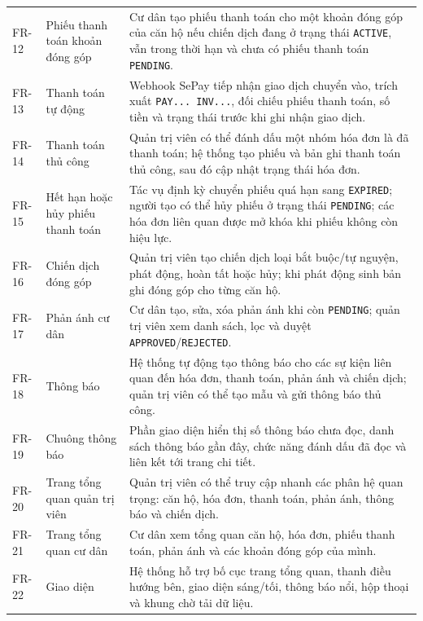 ﻿\documentclass[12pt,a4paper]{report}
\begin{document}
\begin{longtable}{L{1.4cm} L{3cm} L{9cm}}
FR-12 & Phiếu thanh toán khoản đóng góp & Cư dân tạo phiếu thanh toán cho một khoản đóng góp của căn hộ nếu chiến dịch đang ở trạng thái \texttt{ACTIVE}, vẫn trong thời hạn và chưa có phiếu thanh toán \texttt{PENDING}. \\
FR-13 & Thanh toán tự động & Webhook SePay tiếp nhận giao dịch chuyển vào, trích xuất \texttt{PAY... INV...}, đối chiếu phiếu thanh toán, số tiền và trạng thái trước khi ghi nhận giao dịch. \\
FR-14 & Thanh toán thủ công & Quản trị viên có thể đánh dấu một nhóm hóa đơn là đã thanh toán; hệ thống tạo phiếu và bản ghi thanh toán thủ công, sau đó cập nhật trạng thái hóa đơn. \\
FR-15 & Hết hạn hoặc hủy phiếu thanh toán & Tác vụ định kỳ chuyển phiếu quá hạn sang \texttt{EXPIRED}; người tạo có thể hủy phiếu ở trạng thái \texttt{PENDING}; các hóa đơn liên quan được mở khóa khi phiếu không còn hiệu lực. \\
FR-16 & Chiến dịch đóng góp & Quản trị viên tạo chiến dịch loại bắt buộc/tự nguyện, phát động, hoàn tất hoặc hủy; khi phát động sinh bản ghi đóng góp cho từng căn hộ. \\
FR-17 & Phản ánh cư dân & Cư dân tạo, sửa, xóa phản ánh khi còn \texttt{PENDING}; quản trị viên xem danh sách, lọc và duyệt \texttt{APPROVED}/\texttt{REJECTED}. \\
FR-18 & Thông báo & Hệ thống tự động tạo thông báo cho các sự kiện liên quan đến hóa đơn, thanh toán, phản ánh và chiến dịch; quản trị viên có thể tạo mẫu và gửi thông báo thủ công. \\
FR-19 & Chuông thông báo & Phần giao diện hiển thị số thông báo chưa đọc, danh sách thông báo gần đây, chức năng đánh dấu đã đọc và liên kết tới trang chi tiết. \\
FR-20 & Trang tổng quan quản trị viên & Quản trị viên có thể truy cập nhanh các phân hệ quan trọng: căn hộ, hóa đơn, thanh toán, phản ánh, thông báo và chiến dịch. \\
FR-21 & Trang tổng quan cư dân & Cư dân xem tổng quan căn hộ, hóa đơn, phiếu thanh toán, phản ánh và các khoản đóng góp của mình. \\
FR-22 & Giao diện & Hệ thống hỗ trợ bố cục trang tổng quan, thanh điều hướng bên, giao diện sáng/tối, thông báo nổi, hộp thoại và khung chờ tải dữ liệu. \\
\bottomrule
\end{longtable}
\end{document}
